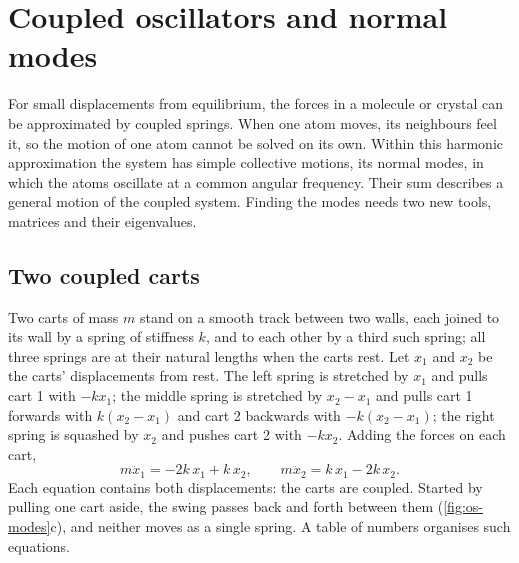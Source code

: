 \section{Coupled oscillators and normal modes}
\label{sec:os-modes}

For small displacements from equilibrium, the forces in a molecule or
crystal can be approximated by coupled springs. When one atom moves, its
neighbours feel it, so the motion of one atom cannot be solved on its own.
Within this harmonic approximation the system has simple collective
motions, its normal modes, in which the atoms oscillate at a common
angular frequency. Their sum describes a general motion of the coupled
system. Finding the modes needs two new tools, matrices and their
eigenvalues.

\subsection*{Two coupled carts}

Two carts of mass $m$ stand on a smooth track between two walls, each
joined to its wall by a spring of stiffness $k$, and to each other by a
third such spring; all three springs are at their natural lengths when
the carts rest. Let $x_1$ and $x_2$ be the carts' displacements from rest.
The left spring is stretched by $x_1$ and pulls cart 1 with $-kx_1$; the
middle spring is stretched by $x_2 - x_1$ and pulls cart 1 forwards with
$k(x_2 - x_1)$ and cart 2 backwards with $-k(x_2 - x_1)$; the right spring
is squashed by $x_2$ and pushes cart 2 with $-kx_2$. Adding the forces on
each cart,
\begin{equation}
   m\ddot{x}_1 = -2k\,x_1 + k\,x_2 , \qquad
   m\ddot{x}_2 = k\,x_1 - 2k\,x_2 .
   \label{eq:os-two-carts}
\end{equation}
Each equation contains both displacements: the carts are coupled. Started
by pulling one cart aside, the swing passes back and forth between them
(\cref{fig:os-modes}c), and neither moves as a single spring. A table of
numbers organises such equations.


